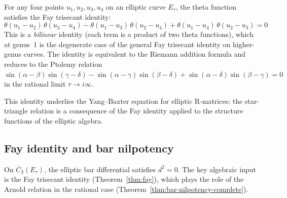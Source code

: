 \begin{theorem}\label{thm:fay}
For any four points $u_1, u_2, u_3, u_4$ on an elliptic curve $E_\tau$, the theta function
satisfies the Fay trisecant identity:
\[
\theta(u_1 - u_2)\,\theta(u_3 - u_4) - \theta(u_1 - u_3)\,\theta(u_2 - u_4) + \theta(u_1 - u_4)\,\theta(u_2 - u_3) = 0
\]
This is a \emph{bilinear} identity (each term is a product of two theta functions), which at genus~1 is the degenerate case of the general Fay trisecant identity on higher-genus curves.  The identity is equivalent to the Riemann addition formula and reduces to the Ptolemy relation $\sin(\alpha-\beta)\sin(\gamma-\delta) - \sin(\alpha-\gamma)\sin(\beta-\delta) + \sin(\alpha-\delta)\sin(\beta-\gamma) = 0$ in the rational limit $\tau \to i\infty$.

This identity underlies the Yang--Baxter equation for elliptic R-matrices:
the star-triangle relation is a consequence of the Fay identity applied to the
structure functions of the elliptic algebra.
\end{theorem}


\subsection{Fay identity and bar nilpotency}

\begin{proposition}[Fay identity implies elliptic \texorpdfstring{$d^2 = 0$}{d2 = 0};
\ClaimStatusProvedHere]\label{prop:fay-implies-d-squared}
On $\overline{C}_3(E_\tau)$, the elliptic bar differential satisfies
$d^2 = 0$.  The key algebraic input is the Fay trisecant identity
(Theorem~\ref{thm:fay}), which plays the role of the Arnold relation
in the rational case (Theorem~\ref{thm:bar-nilpotency-complete}).
\end{proposition}


